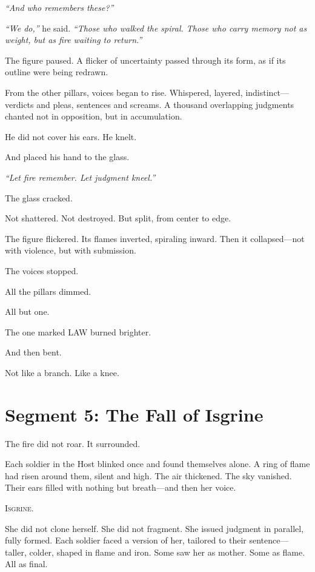 \documentclass[9pt]{article}
\begin{document}
\textit{``And who remembers these?''}

\textit{``We do,''} he said. \textit{``Those who walked the spiral. Those who carry memory not as weight, but as fire waiting to return.''}

The figure paused. A flicker of uncertainty passed through its form, as if its outline were being redrawn.

From the other pillars, voices began to rise. Whispered, layered, indistinct—verdicts and pleas, sentences and screams. A thousand overlapping judgments chanted not in opposition, but in accumulation.

He did not cover his ears. He knelt.

And placed his hand to the glass.

\textit{``Let fire remember. Let judgment kneel.''}

The glass cracked.

Not shattered. Not destroyed. But split, from center to edge.

The figure flickered. Its flames inverted, spiraling inward. Then it collapsed—not with violence, but with submission.

The voices stopped.

All the pillars dimmed.

All but one.

The one marked \textsc{LAW} burned brighter.

And then bent.

Not like a branch. Like a knee.


\newpage

\section*{Segment 5: The Fall of Isgrine}

The fire did not roar. It surrounded.

Each soldier in the Host blinked once and found themselves alone. A ring of flame had risen around them, silent and high. The air thickened. The sky vanished. Their ears filled with nothing but breath—and then her voice.

\textsc{Isgrine.}

She did not clone herself. She did not fragment. She issued judgment in parallel, fully formed. Each soldier faced a version of her, tailored to their sentence—taller, colder, shaped in flame and iron. Some saw her as mother. Some as flame. All as final.
\end{document}
